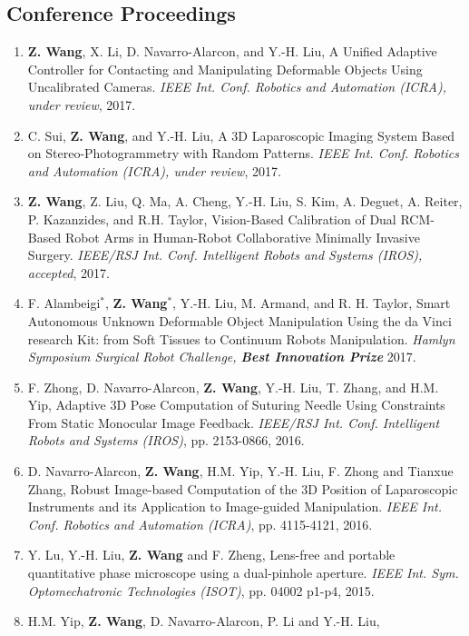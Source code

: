 \documentclass[10pt,letterpaper]{article}
\begin{document}
\subsection*{Conference Proceedings}
\begin{enumerate}
	\item \textbf{Z. Wang}, X. Li, D. Navarro-Alarcon, and Y.-H. Liu,
	A Unified Adaptive Controller for Contacting and Manipulating Deformable Objects Using Uncalibrated Cameras.
	\textit{IEEE Int. Conf. Robotics and Automation (ICRA), under review}, 2017.
	\item C. Sui, \textbf{Z. Wang}, and Y.-H. Liu,
	A 3D Laparoscopic Imaging System Based on Stereo-Photogrammetry with Random Patterns.
	\textit{IEEE Int. Conf. Robotics and Automation (ICRA), under review}, 2017.
    \item \textbf{Z. Wang}, Z. Liu, Q. Ma, A. Cheng, Y.-H. Liu, S. Kim, A. Deguet, A. Reiter, P. Kazanzides, and R.H. Taylor,
    Vision-Based Calibration of Dual RCM-Based Robot Arms in Human-Robot Collaborative Minimally Invasive Surgery.
    \textit{{IEEE/RSJ} Int. Conf. Intelligent Robots and Systems (IROS), accepted}, 2017.
    \item F. Alambeigi$^*$, \textbf{Z. Wang}$^*$, Y.-H. Liu, M. Armand, and R. H. Taylor,
    Smart Autonomous Unknown Deformable Object Manipulation Using the da Vinci research Kit: from Soft Tissues to Continuum Robots Manipulation.
    \textit{Hamlyn Symposium Surgical Robot Challenge, \textbf{Best Innovation Prize}} 2017.
    \item F. Zhong, D. Navarro-Alarcon, \textbf{Z. Wang}, Y.-H. Liu, T. Zhang, and H.M. Yip,
    Adaptive 3D Pose Computation of Suturing Needle Using Constraints From Static Monocular Image Feedback.
    \textit{{IEEE/RSJ} Int. Conf. Intelligent Robots and Systems (IROS)}, pp. 2153-0866, 2016.
    \item D. Navarro-Alarcon, \textbf{Z. Wang}, H.M. Yip, Y.-H. Liu, F. Zhong and Tianxue Zhang,
    Robust Image-based Computation of the 3D Position of Laparoscopic Instruments and its Application to Image-guided Manipulation.
    \textit{{IEEE} Int. Conf. Robotics and Automation (ICRA)}, pp. 4115-4121, 2016.
    \item Y. Lu, Y.-H. Liu, \textbf{Z. Wang} and F. Zheng,
    Lens-free and portable quantitative phase microscope using a dual-pinhole aperture.
    \textit{{IEEE} Int. Sym. Optomechatronic Technologies (ISOT)}, pp. 04002 p1-p4, 2015.
    \item H.M. Yip, \textbf{Z. Wang}, D. Navarro-Alarcon, P. Li and Y.-H. Liu,

\end{enumerate}
\end{document}
